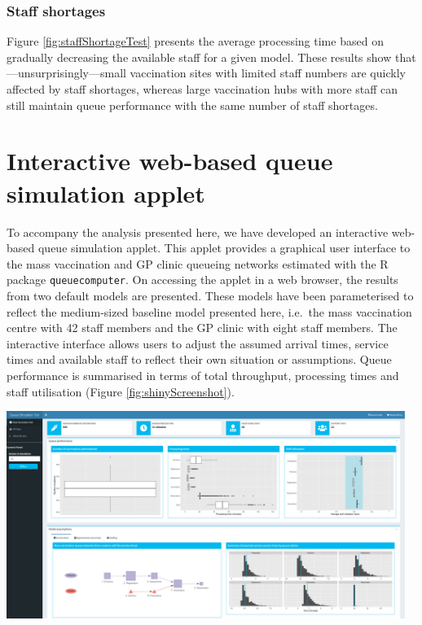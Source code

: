 \documentclass{article}
\let\origfigure\figure
\let\endorigfigure\endfigure
\renewenvironment{figure}[1][2] {
    \expandafter\origfigure\expandafter[H]
} {
    \endorigfigure
}
\begin{document}
\hypertarget{staff-shortages}{%
\subsubsection{Staff shortages}\label{staff-shortages}}

Figure \ref{fig:staffShortageTest} presents the average processing time
based on gradually decreasing the available staff for a given model.
These results show that---unsurprisingly---small vaccination sites with
limited staff numbers are quickly affected by staff shortages, whereas
large vaccination hubs with more staff can still maintain queue
performance with the same number of staff shortages.

\hypertarget{interactive-web-based-queue-simulation-applet}{%
\section{Interactive web-based queue simulation
applet}\label{interactive-web-based-queue-simulation-applet}}

To accompany the analysis presented here, we have developed an
interactive web-based queue simulation applet. This applet provides a
graphical user interface to the mass vaccination and GP clinic queueing
networks estimated with the R package \texttt{queuecomputer}. On
accessing the applet in a web browser, the results from two default
models are presented. These models have been parameterised to reflect
the medium-sized baseline model presented here, i.e.~the mass
vaccination centre with 42 staff members and the GP clinic with eight
staff members. The interactive interface allows users to adjust the
assumed arrival times, service times and available staff to reflect
their own situation or assumptions. Queue performance is summarised in
terms of total throughput, processing times and staff utilisation
(Figure \ref{fig:shinyScreenshot}).

\begin{figure}

{\centering \includegraphics[width=5.09in]{../Data/queue-sim-tool-screenshot} 

}

\caption{Screenshot of the interactive web-based queue simulation applet}\label{fig:shinyScreenshot}
\end{figure}
\end{document}
